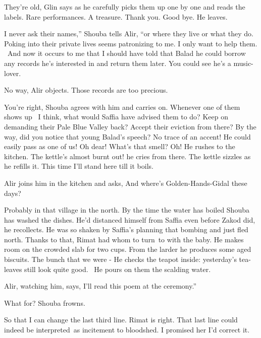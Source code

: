 \documentclass[letterpaper]{article}
\begin{document}
{\textquotedbl}They're old,{\textquotedbl} Glin says as he carefully picks them up one by one and reads the labels.
{\textquotedbl}Rare performances. A treasure. Thank you. Good bye.{\textquotedbl} He leaves.

{\textquotedbl}I never ask their names,'' Shouba tells Alir, ``or where they live or what they do. Poking into their
private lives seems patronizing to me. I only want to help them. ~And now it occurs to me that I should have told that
Balad he could borrow any records he's interested in and return them later. You could see he's a
music-lover.{\textquotedbl} 

{\textquotedbl}No way,{\textquotedbl} Alir objects. {\textquotedbl}Those records are too precious.{\textquotedbl} 

{\textquotedbl}You're right,{\textquotedbl} Shouba agrees with him and carries on. {\textquotedbl}Whenever one of them
shows up \ I think, what would Saffia have advised them to do? Keep on demanding their Pale Blue Valley back? Accept
their eviction from there? By the way, did you notice that young Balad's speech? No trace of an accent! He could easily
pass as one of us! Oh dear! What's that smell? Oh!{\textquotedbl} He rushes to the kitchen. {\textquotedbl}The kettle's
almost burnt out!{\textquotedbl} he cries from there. The kettle sizzles as he refills it. {\textquotedbl}This time
I'll stand here till it boils.{\textquotedbl}

Alir joins him in the kitchen and asks, {\textquotedbl}And where's Golden-Hands-Gidal these days?{\textquotedbl} 

{\textquotedbl}Probably in that village in the north.{\textquotedbl} By the time the water has boiled Shouba has washed
the dishes. {\textquotedbl}He'd distanced himself from Saffia even before Zakod did,{\textquotedbl} he recollects.
{\textquotedbl}He was so shaken by Saffia's planning that bombing and just fled north. Thanks to that, Rimat had whom
to turn~to with the baby.{\textquotedbl} He makes room on the crowded slab for two cups. From the larder he produces
some aged biscuits. {\textquotedbl}The bunch that we were -{\textquotedbl} He checks the teapot inside: yesterday's
tea-leaves still look quite good. ~He pours on them the scalding water.

Alir, watching him, says, {\textquotedbl}I'll read this poem at the ceremony.''~ 

{\textquotedbl}What for?{\textquotedbl} Shouba frowns. \ 

{\textquotedbl}So that I can change the last third line. Rimat is right. That last line could indeed be interpreted~as
incitement to bloodshed. I promised her I'd correct it.{\textquotedbl} 
\end{document}
